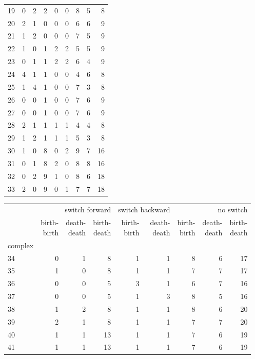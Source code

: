 \documentclass{article}
\begin{document}
\begin{center}
\begin{tabular}{lrrrrrrrr}
19 & 0 & 2 & 2 & 0 & 0 & 8 & 5 & 8 \\
20 & 2 & 1 & 0 & 0 & 0 & 6 & 6 & 9 \\
21 & 1 & 2 & 0 & 0 & 0 & 7 & 5 & 9 \\
22 & 1 & 0 & 1 & 2 & 2 & 5 & 5 & 9 \\
23 & 0 & 1 & 1 & 2 & 2 & 6 & 4 & 9 \\
24 & 4 & 1 & 1 & 0 & 0 & 4 & 6 & 8 \\
25 & 1 & 4 & 1 & 0 & 0 & 7 & 3 & 8 \\
26 & 0 & 0 & 1 & 0 & 0 & 7 & 6 & 9 \\
27 & 0 & 0 & 1 & 0 & 0 & 7 & 6 & 9 \\
28 & 2 & 1 & 1 & 1 & 1 & 4 & 4 & 8 \\
29 & 1 & 2 & 1 & 1 & 1 & 5 & 3 & 8 \\
30 & 1 & 0 & 8 & 0 & 2 & 9 & 7 & 16 \\
31 & 0 & 1 & 8 & 2 & 0 & 8 & 8 & 16 \\
32 & 0 & 2 & 9 & 1 & 0 & 8 & 6 & 18 \\
33 & 2 & 0 & 9 & 0 & 1 & 7 & 7 & 18 \\
\bottomrule
\end{tabular}

\begin{tabular}{lrrrrrrrr}
\toprule
& \multicolumn{3}{r}{switch forward} & \multicolumn{2}{r}{switch backward} & \multicolumn{3}{r}{no switch} \\
& \makecell{birth-\\birth} & \makecell{death-\\death} & \makecell{birth-\\death} & \makecell{birth-\\birth} & \makecell{death-\\death} & \makecell{birth-\\birth} & \makecell{death-\\death} & \makecell{birth-\\death} \\
complex &  &  &  &  &  &  &  &  \\
\midrule
34 & 0 & 1 & 8 & 1 & 1 & 8 & 6 & 17 \\
35 & 1 & 0 & 8 & 1 & 1 & 7 & 7 & 17 \\
36 & 0 & 0 & 5 & 3 & 1 & 6 & 7 & 16 \\
37 & 0 & 0 & 5 & 1 & 3 & 8 & 5 & 16 \\
38 & 1 & 2 & 8 & 1 & 1 & 8 & 6 & 20 \\
39 & 2 & 1 & 8 & 1 & 1 & 7 & 7 & 20 \\
40 & 1 & 1 & 13 & 1 & 1 & 7 & 6 & 19 \\
41 & 1 & 1 & 13 & 1 & 1 & 7 & 6 & 19 \\
\bottomrule
\end{tabular}

\end{center}
\end{document}
